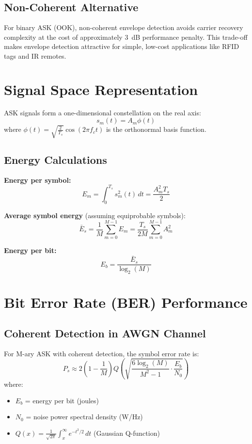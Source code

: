 \subsection{Non-Coherent Alternative}

For binary ASK (OOK), non-coherent envelope detection avoids carrier recovery complexity at the cost of approximately 3~dB performance penalty. This trade-off makes envelope detection attractive for simple, low-cost applications like RFID tags and IR remotes.

\section{Signal Space Representation}

ASK signals form a one-dimensional constellation on the real axis:
\begin{equation}
s_m(t) = A_m \phi(t)
\end{equation}
where $\phi(t) = \sqrt{\frac{2}{T_s}} \cos(2\pi f_c t)$ is the orthonormal basis function.

\subsection{Energy Calculations}

\textbf{Energy per symbol:}
\begin{equation}
E_m = \int_0^{T_s} s_m^2(t) \, dt = \frac{A_m^2 T_s}{2}
\end{equation}

\textbf{Average symbol energy} (assuming equiprobable symbols):
\begin{equation}
\bar{E}_s = \frac{1}{M} \sum_{m=0}^{M-1} E_m = \frac{T_s}{2M} \sum_{m=0}^{M-1} A_m^2
\end{equation}

\textbf{Energy per bit:}
\begin{equation}
E_b = \frac{\bar{E}_s}{\log_2(M)}
\end{equation}

\section{Bit Error Rate (BER) Performance}

\subsection{Coherent Detection in AWGN Channel}

For M-ary ASK with coherent detection, the symbol error rate is:
\begin{equation}
P_s \approx 2\left(1 - \frac{1}{M}\right) Q\left(\sqrt{\frac{6\log_2(M)}{M^2 - 1} \cdot \frac{E_b}{N_0}}\right)
\end{equation}
where:
\begin{itemize}
\item $E_b$ = energy per bit (joules)
\item $N_0$ = noise power spectral density (W/Hz)
\item $Q(x) = \frac{1}{\sqrt{2\pi}}\int_x^\infty e^{-t^2/2}\,dt$ (Gaussian Q-function)
\end{itemize}


